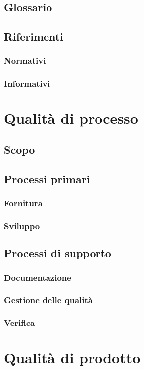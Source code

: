 \documentclass[a4paper, 11pt]{article}
\begin{document}
\subsection{Glossario}
\subsection{Riferimenti}
\subsubsection{Normativi}
\subsubsection{Informativi}

\section{Qualità di processo}
\subsection{Scopo}
\subsection{Processi primari}
\subsubsection{Fornitura}
\subsubsection{Sviluppo}
\subsection{Processi di supporto}
\subsubsection{Documentazione}
\subsubsection{Gestione delle qualità}
\subsubsection{Verifica}

\section{Qualità di prodotto}
\end{document}
